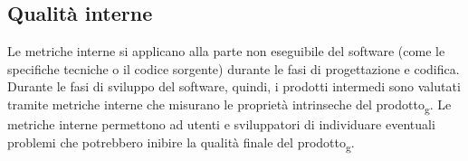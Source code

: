 \subsection{Qualità interne}
Le metriche interne si applicano alla parte non eseguibile del software (come le specifiche tecniche o il codice sorgente) durante le fasi di progettazione e codifica. Durante le fasi di sviluppo del software, quindi, i prodotti intermedi sono valutati tramite metriche interne che misurano le proprietà intrinseche del prodotto\textsubscript{g}. 
Le metriche interne permettono ad utenti e sviluppatori di individuare eventuali problemi che potrebbero inibire la qualità finale del prodotto\textsubscript{g}.